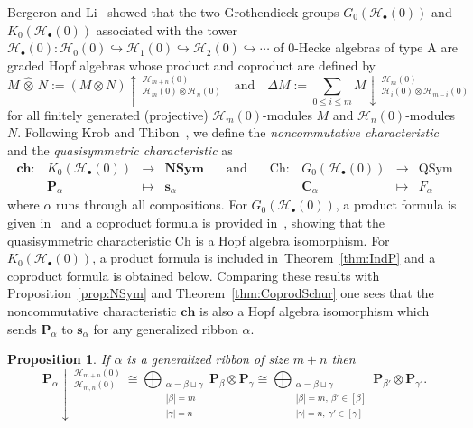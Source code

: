 \documentclass{amsart}
\newtheorem{proposition}[theorem]{Proposition}
\newtheorem*{Young's Rule}{Young's Rule}
\theoremstyle{definition}
\theoremstyle{remark}
\numberwithin{equation}{section}
\begin{document}
Bergeron and Li~\cite{BergeronLi} showed that the two Grothendieck groups $G_0({\mathcal{H}}_\bullet(0))$ and $K_0({\mathcal{H}}_\bullet(0))$ associated with the tower  ${\mathcal{H}}_\bullet(0): {\mathcal{H}}_0(0)\hookrightarrow {\mathcal{H}}_1(0) \hookrightarrow {\mathcal{H}}_2(0) \hookrightarrow\cdots$ of 0-Hecke algebras of type A are graded Hopf algebras whose  product and coproduct are defined by
\[
M \,\widehat{\otimes}\, N := (M\otimes N)\uparrow\,_{{\mathcal{H}}_m(0)\otimes{\mathcal{H}}_n(0)}^{{\mathcal{H}}_{m+n}(0)} 
{\quad\text{and}\quad} \Delta M := \sum_{0\le i\le m} M\downarrow\,_{{\mathcal{H}}_i(0)\otimes{\mathcal{H}}_{m-i}(0)}^{{\mathcal{H}}_m(0)}
\]
for all finitely generated (projective) ${\mathcal{H}}_m(0)$-modules $M$ and ${\mathcal{H}}_n(0)$-modules $N$. Following Krob and Thibon~\cite{KrobThibon}, we define the \emph{noncommutative characteristic} and the \emph{quasisymmetric characteristic} as 
\[ \begin{matrix}
\mathbf{ch}: & K_0({\mathcal{H}}_\bullet(0)) & \to & {\mathbf{NSym}} & {\quad\text{and}\quad} & \mathrm{Ch}: & G_0({\mathcal{H}}_\bullet(0)) & \to & {\mathrm{QSym}} \\
& {\mathbf{P}}_\alpha & \mapsto & {{\mathbf s}}_\alpha & & & {\mathbf{C}}_\alpha & \mapsto & F_\alpha  
\end{matrix} \]
where $\alpha$ runs through all compositions. For $G_0({\mathcal{H}}_\bullet(0))$, a product formula is given in~\cite{NCSFIII,QSymNSymH0} and a coproduct formula is provided in~\cite{KrobThibon}, showing that the quasisymmetric characteristic Ch is a Hopf algebra isomorphism. For $K_0({\mathcal{H}}_\bullet(0))$, a product formula is included in~Theorem~\ref{thm:IndP} and a coproduct formula is obtained below. Comparing these results with Proposition~\ref{prop:NSym} and Theorem~\ref{thm:CoprodSchur} one sees that the noncommutative characteristic $\mathbf{ch}$ is also a Hopf algebra isomorphism which sends ${\mathbf{P}}_\alpha$ to ${{\mathbf s}}_\alpha$ for any generalized ribbon $\alpha$.

\begin{proposition}\label{prop:ResP}
If $\alpha$ is a generalized ribbon of size $m+n$ then
\[ {\mathbf{P}}_\alpha\downarrow\,_{{\mathcal{H}}_{m,n}(0)}^{{\mathcal{H}}_{m+n}(0)}\ \cong 
\bigoplus_{\substack{\alpha=\beta\sqcup\gamma \\ |\beta|=m \\ |\gamma|=n} } {\mathbf{P}}_\beta\otimes {\mathbf{P}}_\gamma
\cong \bigoplus_{\substack{\alpha=\beta\sqcup\gamma \\ |\beta|=m,\ \beta'\in[\beta] \\ |\gamma|=n,\ \gamma'\in[\gamma]} } {\mathbf{P}}_{\beta'}\otimes {\mathbf{P}}_{\gamma'}.\]
\end{proposition}
\end{document}
